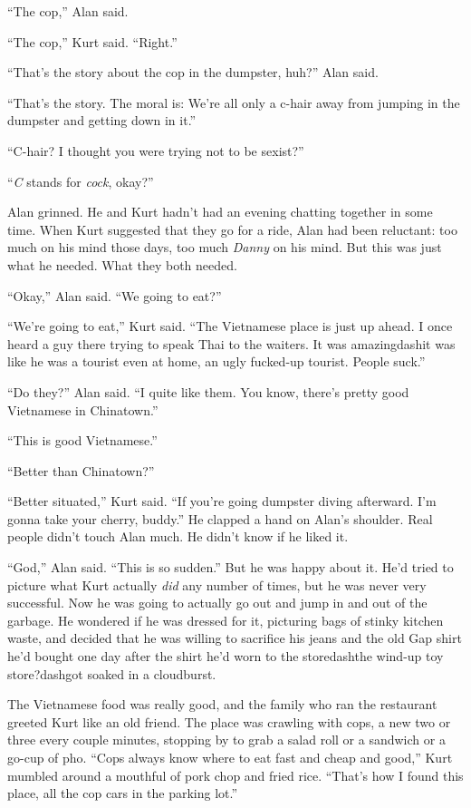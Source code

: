 ``The cop,'' Alan said.

``The cop,'' Kurt said.  ``Right.''

``That's the story about the cop in the dumpster, huh?'' Alan said.

``That's the story.  The moral is:  We're all only a c-hair away from
jumping in the dumpster and getting down in it.''

``C-hair?  I thought you were trying not to be sexist?''

``\textit{C} stands for \textit{cock}, okay?''

Alan grinned.  He and Kurt hadn't had an evening chatting together in
some time.  When Kurt suggested that they go for a ride, Alan had been
reluctant:  too much on his mind those days, too much \textit{Danny}
on his mind.  But this was just what he needed.  What they both
needed.

``Okay,'' Alan said.  ``We going to eat?''

``We're going to eat,'' Kurt said.  ``The Vietnamese place is just up
ahead.  I once heard a guy there trying to speak Thai to the waiters. 
It was amazingdash{}it was like he was a tourist even at home, an ugly
fucked-up tourist.  People suck.''

``Do they?'' Alan said.  ``I quite like them.  You know, there's
pretty good Vietnamese in Chinatown.''

``This is good Vietnamese.''

``Better than Chinatown?''

``Better situated,'' Kurt said.  ``If you're going dumpster diving
afterward.  I'm gonna take your cherry, buddy.'' He clapped a hand on
Alan's shoulder.  Real people didn't touch Alan much.  He didn't know
if he liked it.

``God,'' Alan said.  ``This is so sudden.'' But he was happy about it. 
He'd tried to picture what Kurt actually \textit{did} any number of
times, but he was never very successful.  Now he was going to actually
go out and jump in and out of the garbage.  He wondered if he was
dressed for it, picturing bags of stinky kitchen waste, and decided
that he was willing to sacrifice his jeans and the old Gap shirt he'd
bought one day after the shirt he'd worn to the storedash{}the wind-up
toy store?dash{}got soaked in a cloudburst.

The Vietnamese food was really good, and the family who ran the
restaurant greeted Kurt like an old friend.  The place was crawling
with cops, a new two or three every couple minutes, stopping by to
grab a salad roll or a sandwich or a go-cup of pho.  ``Cops always
know where to eat fast and cheap and good,'' Kurt mumbled around a
mouthful of pork chop and fried rice.  ``That's how I found this
place, all the cop cars in the parking lot.''

